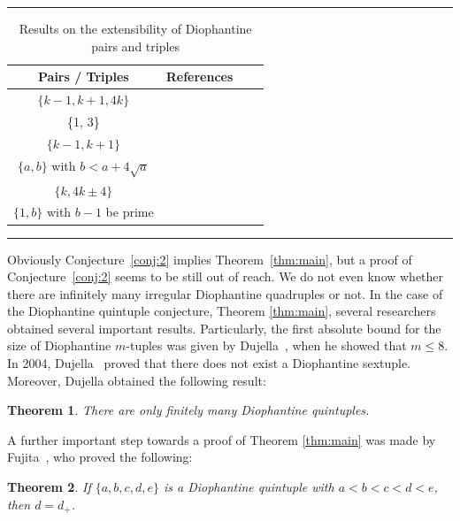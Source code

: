 \documentclass{amsart}
\newtheorem{theorem}{Theorem}
\theoremstyle{definition}
\begin{document}
\begin{table}[!h]\label{tbl:1}
\begin{center}
\def\temptablewidth{0.6\textwidth}
{\rule{\temptablewidth}{1 pt}}
\begin{tabular*}{\temptablewidth}{@{\extracolsep{\fill}}cccc}
 {\bf Pairs / Triples } & {\bf References}   \\   \hline
 $\{k-1, k+1, 4k\}$  & \cite{Dujella:1997-1}   \\   \hline
  \{1, 3\}        & \cite{Dujella-Pethoe:1998}     \\ \hline
 $\{k-1,k+1\}$        &     \cite{Fujita,BDM}   \\ \hline
 $\{a,b\}$ with $b<a+4\sqrt{a}$   &  \cite{FFT2}  \\ \hline
  $\{k, 4k\pm 4\}$       &   \cite{FFT2,HPST}  \\ \hline
  $\{1, b\}$ with $b-1$ be prime       &   \cite{HPTY}  
              \end{tabular*}
       {\rule{\temptablewidth}{1pt}}
       \end{center}
    \tabcolsep 0pt \caption{Results on the extensibility of Diophantine pairs and triples} \vspace*{-12pt}
       \end{table}       

       
Obviously Conjecture~\ref{conj:2} implies Theorem~\ref{thm:main}, but a proof of Conjecture~\ref{conj:2} seems to be still out of reach. We do not
even know whether there are infinitely many irregular Diophantine quadruples or not. In the case of the Diophantine quintuple conjecture, Theorem \ref{thm:main}, several researchers obtained several important results. Particularly, the first absolute bound for the size of Diophantine $m$-tuples was given by Dujella~\cite{Dujella:2001}, when he showed that $m\le 8$. In 2004, Dujella~\cite{Dujella:2004} proved that there does not exist a Diophantine sextuple. Moreover, Dujella obtained the following result:

\begin{theorem}\label{thm:dujella}
 There are only finitely many Diophantine quintuples.
 \end{theorem}
 
 A further important step towards a proof of Theorem \ref{thm:main} was made by Fujita~\cite{Fujita-1}, who proved the following:
 
 \begin{theorem}\label{thm:fujita}
 If $\{a,b,c,d,e\}$ is a Diophantine quintuple with $a<b<c<d<e$, then $d=d_{+}$.
 \end{theorem}
 
\end{document}
